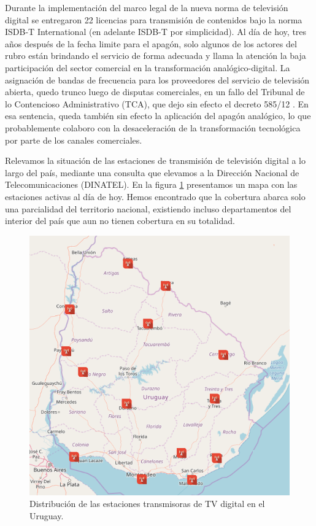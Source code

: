 Durante la implementación del marco legal de la nueva norma de televisión digital se entregaron 22 licencias para transmisión de contenidos bajo la norma ISDB-T International (en adelante ISDB-T por simplicidad). Al día de hoy, tres años después de la fecha limite para el apagón, solo algunos de los actores del rubro están brindando el servicio de forma adecuada y llama la atención la baja participación del sector comercial en la transformación analógico-digital. La asignación de bandas de frecuencia para los proveedores del servicio de televisión abierta, quedo trunco luego de disputas comerciales, en un fallo del Tribunal de lo Contencioso Administrativo (TCA), que dejo sin efecto el decreto 585/12 \cite{cancelacion_decreto_apagon}. En esa sentencia, queda también sin efecto la aplicación del apagón analógico, lo que probablemente colaboro con la desaceleración de la transformación tecnológica por parte de los canales comerciales.

Relevamos la situación de las estaciones de transmisión de televisión digital a lo largo del país, mediante una consulta que elevamos a la Dirección Nacional de Telecomunicaciones (DINATEL). En la figura \ref{mapa_estaciones} presentamos un mapa con las estaciones activas al día de hoy. Hemos encontrado que la cobertura abarca solo una parcialidad del territorio nacional, existiendo incluso departamentos del interior del país que aun no tienen cobertura en su totalidad. 

\begin{figure}
	\centering
	\includegraphics[scale=0.3]{figuras/cap01/mapa_estaciones}
	\caption{\label{mapa_estaciones} Distribución de las estaciones transmisoras de TV digital en el Uruguay.}
\end{figure}

